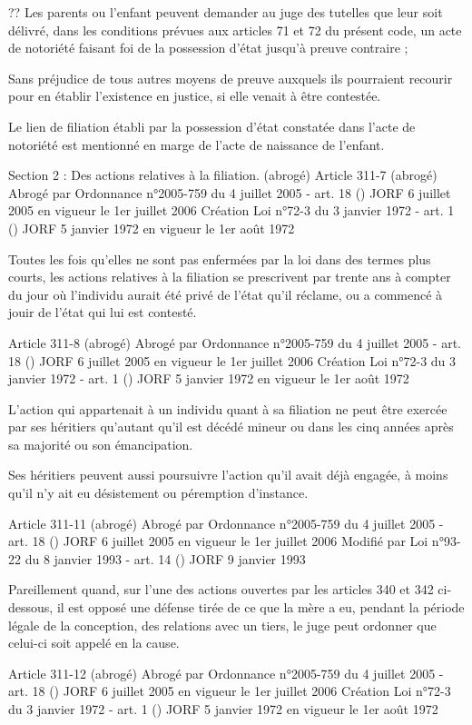 \documentclass[
  12pt,
]{book}
\begin{document}
\begin{encadre}{??}
Les parents ou l'enfant peuvent demander au juge des tutelles que leur soit délivré, dans les conditions prévues aux articles 71 et 72 du présent code, un acte de notoriété faisant foi de la possession d'état jusqu'à preuve contraire ;

Sans préjudice de tous autres moyens de preuve auxquels ils pourraient recourir pour en établir l'existence en justice, si elle venait à être contestée.

Le lien de filiation établi par la possession d'état constatée dans l'acte de notoriété est mentionné en marge de l'acte de naissance de l'enfant.

Section 2 : Des actions relatives à la filiation. (abrogé)
Article 311-7 (abrogé)
Abrogé par Ordonnance n°2005-759 du 4 juillet 2005 - art. 18 () JORF 6 juillet 2005 en vigueur le 1er juillet 2006
Création Loi n°72-3 du 3 janvier 1972 - art. 1 () JORF 5 janvier 1972 en vigueur le 1er août 1972

Toutes les fois qu'elles ne sont pas enfermées par la loi dans des termes plus courts, les actions relatives à la filiation se prescrivent par trente ans à compter du jour où l'individu aurait été privé de l'état qu'il réclame, ou a commencé à jouir de l'état qui lui est contesté.

Article 311-8 (abrogé)
Abrogé par Ordonnance n°2005-759 du 4 juillet 2005 - art. 18 () JORF 6 juillet 2005 en vigueur le 1er juillet 2006
Création Loi n°72-3 du 3 janvier 1972 - art. 1 () JORF 5 janvier 1972 en vigueur le 1er août 1972

L'action qui appartenait à un individu quant à sa filiation ne peut être exercée par ses héritiers qu'autant qu'il est décédé mineur ou dans les cinq années après sa majorité ou son émancipation.

Ses héritiers peuvent aussi poursuivre l'action qu'il avait déjà engagée, à moins qu'il n'y ait eu désistement ou péremption d'instance.

Article 311-11 (abrogé)
Abrogé par Ordonnance n°2005-759 du 4 juillet 2005 - art. 18 () JORF 6 juillet 2005 en vigueur le 1er juillet 2006
Modifié par Loi n°93-22 du 8 janvier 1993 - art. 14 () JORF 9 janvier 1993

Pareillement quand, sur l'une des actions ouvertes par les articles 340 et 342 ci-dessous, il est opposé une défense tirée de ce que la mère a eu, pendant la période légale de la conception, des relations avec un tiers, le juge peut ordonner que celui-ci soit appelé en la cause.

Article 311-12 (abrogé)
Abrogé par Ordonnance n°2005-759 du 4 juillet 2005 - art. 18 () JORF 6 juillet 2005 en vigueur le 1er juillet 2006
Création Loi n°72-3 du 3 janvier 1972 - art. 1 () JORF 5 janvier 1972 en vigueur le 1er août 1972


\end{encadre}
\end{document}
